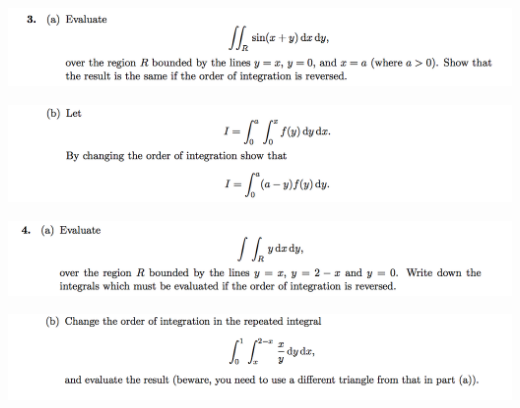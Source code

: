 \documentclass[12pt]{article}
\begin{document}
\begin{mdframed}
\includegraphics[width=400pt]{img/oxford-prelims-M5-multivariable-calc-1-3-a.png}
\end{mdframed}

\begin{mdframed}
\includegraphics[width=400pt]{img/oxford-prelims-M5-multivariable-calc-1-3-b.png}
\end{mdframed}

\begin{mdframed}
\includegraphics[width=400pt]{img/oxford-prelims-M5-multivariable-calc-1-4-a.png}
\end{mdframed}

\begin{mdframed}
\includegraphics[width=400pt]{img/oxford-prelims-M5-multivariable-calc-1-4-b.png}
\end{mdframed}
\end{document}

